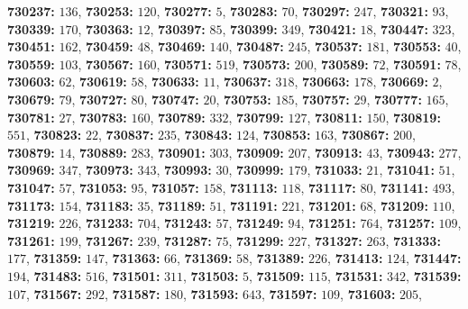 \textsf{\bfseries 730237:} $136$, \textsf{\bfseries 730253:} $120$, \textsf{\bfseries 730277:} $5$, \textsf{\bfseries 730283:} $70$, \textsf{\bfseries 730297:} $247$, \textsf{\bfseries 730321:} $93$, \textsf{\bfseries 730339:} $170$, \textsf{\bfseries 730363:} $12$, \textsf{\bfseries 730397:} $85$, \textsf{\bfseries 730399:} $349$, \textsf{\bfseries 730421:} $18$, \textsf{\bfseries 730447:} $323$, \textsf{\bfseries 730451:} $162$, \textsf{\bfseries 730459:} $48$, \textsf{\bfseries 730469:} $140$, \textsf{\bfseries 730487:} $245$, \textsf{\bfseries 730537:} $181$, \textsf{\bfseries 730553:} $40$, \textsf{\bfseries 730559:} $103$, \textsf{\bfseries 730567:} $160$, \textsf{\bfseries 730571:} $519$, \textsf{\bfseries 730573:} $200$, \textsf{\bfseries 730589:} $72$, \textsf{\bfseries 730591:} $78$, \textsf{\bfseries 730603:} $62$, \textsf{\bfseries 730619:} $58$, \textsf{\bfseries 730633:} $11$, \textsf{\bfseries 730637:} $318$, \textsf{\bfseries 730663:} $178$, \textsf{\bfseries 730669:} $2$, \textsf{\bfseries 730679:} $79$, \textsf{\bfseries 730727:} $80$, \textsf{\bfseries 730747:} $20$, \textsf{\bfseries 730753:} $185$, \textsf{\bfseries 730757:} $29$, \textsf{\bfseries 730777:} $165$, \textsf{\bfseries 730781:} $27$, \textsf{\bfseries 730783:} $160$, \textsf{\bfseries 730789:} $332$, \textsf{\bfseries 730799:} $127$, \textsf{\bfseries 730811:} $150$, \textsf{\bfseries 730819:} $551$, \textsf{\bfseries 730823:} $22$, \textsf{\bfseries 730837:} $235$, \textsf{\bfseries 730843:} $124$, \textsf{\bfseries 730853:} $163$, \textsf{\bfseries 730867:} $200$, \textsf{\bfseries 730879:} $14$, \textsf{\bfseries 730889:} $283$, \textsf{\bfseries 730901:} $303$, \textsf{\bfseries 730909:} $207$, \textsf{\bfseries 730913:} $43$, \textsf{\bfseries 730943:} $277$, \textsf{\bfseries 730969:} $347$, \textsf{\bfseries 730973:} $343$, \textsf{\bfseries 730993:} $30$, \textsf{\bfseries 730999:} $179$, \textsf{\bfseries 731033:} $21$, \textsf{\bfseries 731041:} $51$, \textsf{\bfseries 731047:} $57$, \textsf{\bfseries 731053:} $95$, \textsf{\bfseries 731057:} $158$, \textsf{\bfseries 731113:} $118$, \textsf{\bfseries 731117:} $80$, \textsf{\bfseries 731141:} $493$, \textsf{\bfseries 731173:} $154$, \textsf{\bfseries 731183:} $35$, \textsf{\bfseries 731189:} $51$, \textsf{\bfseries 731191:} $221$, \textsf{\bfseries 731201:} $68$, \textsf{\bfseries 731209:} $110$, \textsf{\bfseries 731219:} $226$, \textsf{\bfseries 731233:} $704$, \textsf{\bfseries 731243:} $57$, \textsf{\bfseries 731249:} $94$, \textsf{\bfseries 731251:} $764$, \textsf{\bfseries 731257:} $109$, \textsf{\bfseries 731261:} $199$, \textsf{\bfseries 731267:} $239$, \textsf{\bfseries 731287:} $75$, \textsf{\bfseries 731299:} $227$, \textsf{\bfseries 731327:} $263$, \textsf{\bfseries 731333:} $177$, \textsf{\bfseries 731359:} $147$, \textsf{\bfseries 731363:} $66$, \textsf{\bfseries 731369:} $58$, \textsf{\bfseries 731389:} $226$, \textsf{\bfseries 731413:} $124$, \textsf{\bfseries 731447:} $194$, \textsf{\bfseries 731483:} $516$, \textsf{\bfseries 731501:} $311$, \textsf{\bfseries 731503:} $5$, \textsf{\bfseries 731509:} $115$, \textsf{\bfseries 731531:} $342$, \textsf{\bfseries 731539:} $107$, \textsf{\bfseries 731567:} $292$, \textsf{\bfseries 731587:} $180$, \textsf{\bfseries 731593:} $643$, \textsf{\bfseries 731597:} $109$, \textsf{\bfseries 731603:} $205$, 
